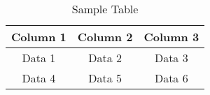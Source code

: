 \begin{table}[ht]
    \centering
    \caption{Sample Table}
    \label{tab:sampleTable}
    \begin{tabular}{|c|c|c|}
        \hline
        Column 1 & Column 2 & Column 3 \\
        \hline
        Data 1 & Data 2 & Data 3 \\
        Data 4 & Data 5 & Data 6 \\
        \hline
    \end{tabular}
\end{table}